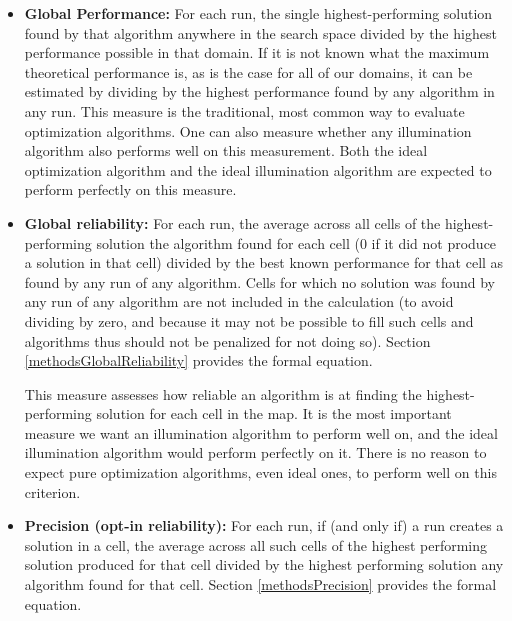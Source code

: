 \documentclass[twocolumn, DIV25, 9pt]{scrartcl}
\begin{document}
\begin{itemize}

\item{\textbf{Global Performance:} For each run, the single highest-performing solution found by that algorithm anywhere in the search space divided by the highest performance possible in that domain. If it is not known what the maximum theoretical performance is, as is the case for all of our domains, it can be estimated by dividing by the highest performance found by any algorithm in any run. This measure is the traditional, most common way to evaluate optimization algorithms. One can also measure whether any illumination algorithm also performs well on this measurement. Both the ideal optimization algorithm and the ideal illumination algorithm are expected to perform perfectly on this measure.}

\item{\textbf{Global reliability:} For each run, the average across all cells of the highest-performing solution the algorithm found for each cell (0 if it did not produce a solution in that cell) divided by the best known performance for that cell as found by any run of any algorithm. Cells for which no solution was found by any run of any algorithm are not included in the calculation (to avoid dividing by zero, and because it may not be possible to fill such cells and algorithms thus should not be penalized for not doing so). Section \ref{methodsGlobalReliability} provides the formal equation. 

This measure assesses how reliable an algorithm is at finding the highest-performing solution for each cell in the map. It is the most important measure we want an illumination algorithm to perform well on, and the ideal illumination algorithm would perform perfectly on it. There is no reason to expect pure optimization algorithms, even ideal ones, to perform well on this criterion.
}

\item{\textbf{Precision (opt-in reliability):} For each run, if (and only if) a run creates a solution in a cell, the average across all such cells of the highest performing solution produced for that cell divided by the highest performing solution any algorithm found for that cell. Section \ref{methodsPrecision} provides the formal equation.

}
\end{itemize}
\end{document}
